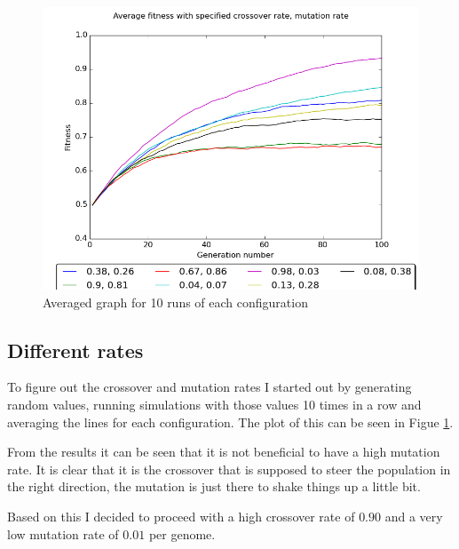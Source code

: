 \begin{figure}[width=\textwidth]
    \begin{centering}
        \includegraphics[width=\linewidth]{img/random_rates.png}
        \caption{Averaged graph for 10 runs of each configuration}
        \label{different_rates}
    \end{centering}
\end{figure}

\subsection*{Different rates}
To figure out the crossover and mutation rates I started out by generating random values,
running simulations with those values 10 times in a row and averaging the lines for each configuration.
The plot of this can be seen in Figue \ref{different_rates}.


From the results it can be seen that it is not beneficial to have a high mutation rate.
It is clear that it is the crossover that is supposed to steer the population in the right direction,
the mutation is just there to shake things up a little bit.

Based on this I decided to proceed with a high crossover rate of $0.90$ and a very low mutation rate of $0.01$ per genome.

